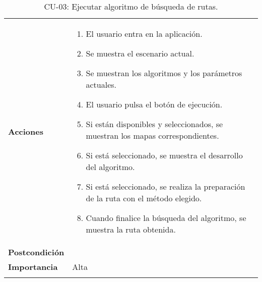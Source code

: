 \begin{longtable}[H]{@{}ll@{}}
\begin{minipage}[t]{0.23\columnwidth}\raggedright\strut
\textbf{Acciones}\strut
\end{minipage} & \begin{minipage}[t]{0.71\columnwidth}\raggedright\strut
\begin{enumerate}
\def\labelenumi{\arabic{enumi}.}
\tightlist
\item
  El usuario entra en la aplicación.
\item
  Se muestra el escenario actual.
\item
  Se muestran los algoritmos y los parámetros actuales.
\item
  El usuario pulsa el botón de ejecución.
\item
  Si están disponibles y seleccionados, se muestran los mapas correspondientes.
\item
  Si está seleccionado, se muestra el desarrollo del algoritmo.
\item
  Si está seleccionado, se realiza la preparación de la ruta con el método elegido.
\item
  Cuando finalice la búsqueda del algoritmo, se muestra la ruta obtenida.
\end{enumerate}\strut
\end{minipage}\tabularnewline

\begin{minipage}[t]{0.23\columnwidth}\raggedright\strut
\textbf{Postcondición}\strut
\end{minipage} & \begin{minipage}[t]{0.71\columnwidth}\raggedright\strut
\strut
\end{minipage}\tabularnewline

\begin{minipage}[t]{0.23\columnwidth}\raggedright\strut
\textbf{Importancia}\strut
\end{minipage} & \begin{minipage}[t]{0.71\columnwidth}\raggedright\strut
Alta\strut
\end{minipage}\tabularnewline

\bottomrule
\caption{CU-03: Ejecutar algoritmo de búsqueda de rutas.}
\end{longtable}



